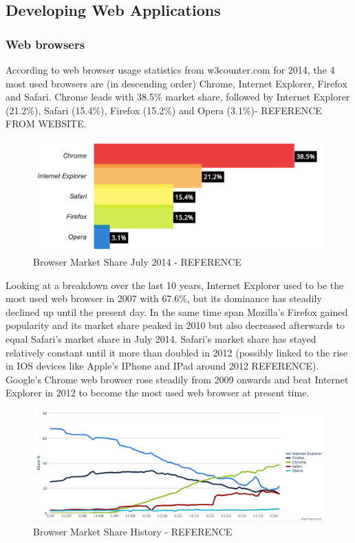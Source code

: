 \documentclass[a4paper,11pt,twoside]{article}
\begin{document}
\subsection{Developing Web Applications}

\subsubsection{Web browsers}

According to web browser usage statistics from w3counter.com for 2014, the 4 most used
browsers are (in descending order) Chrome, Internet Explorer, Firefox
and Safari. Chrome leads with 38.5\% market share, followed by Internet Explorer (21.2\%), Safari (15.4\%), Firefox (15.2\%) and Opera (3.1\%)- REFERENCE FROM WEBSITE.

\begin{figure}[ht!]
\centering
\includegraphics[width=170mm]{graphics/webStats_01.png}
\caption{Browser Market Share July 2014 - REFERENCE}
\label{fig:UIdesign1}
\end{figure}

Looking at a breakdown over the last 10 years, Internet Explorer used to be the most used web browser in 2007 with 67.6\%, but its dominance has steadily declined up until the present day. In the same time span Mozilla's Firefox gained popularity and its market share peaked in 2010 but also decreased afterwards to equal Safari's market share in July 2014. Safari's market share has stayed relatively constant until it more than doubled in 2012 (possibly linked to the rise in IOS devices like Apple's IPhone and IPad around 2012 REFERENCE). Google's Chrome web browser rose steadily from 2009 onwards and beat Internet Explorer in 2012 to become the most used web browser at present time.

\begin{figure}[ht!]
\centering
\includegraphics[width=170mm]{graphics/webStats_02.png}
\caption{Browser Market Share History - REFERENCE}
\label{fig:UIdesign1}
\end{figure}
\end{document}

